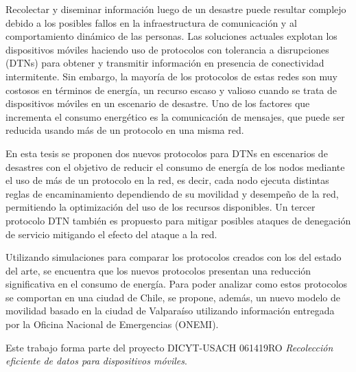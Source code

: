 

Recolectar y diseminar informaci\'on luego de un desastre puede resultar
complejo debido a los posibles fallos en la infraestructura de comunicaci\'on y
al comportamiento din\'amico de las personas. Las soluciones actuales explotan los
dispositivos m\'oviles haciendo uso de protocolos con tolerancia a disrupciones
(DTNs) para obtener y transmitir informaci\'on en presencia de conectividad
intermitente. Sin embargo, la mayor\'ia de los protocolos de estas redes son muy
costosos en t\'erminos de energ\'ia, un recurso escaso y valioso cuando se trata
de dispositivos m\'oviles en un escenario de desastre. Uno de los factores que
incrementa el consumo energético es la comunicación de mensajes, que puede ser
reducida usando más de un protocolo en una misma red.


En esta tesis se proponen dos nuevos protocolos para DTNs en escenarios de
desastres con el objetivo de reducir el consumo de energía de los nodos mediante
el uso de más de un protocolo en la red, es decir, cada nodo ejecuta distintas
reglas de encaminamiento dependiendo de su movilidad y desempeño de la red,
permitiendo la optimización del uso de los recursos disponibles. Un tercer
protocolo DTN también es propuesto para mitigar posibles ataques de denegación
de servicio mitigando el efecto del ataque a la red.

Utilizando simulaciones para comparar los protocolos creados con los del estado
del arte, se encuentra que los nuevos protocolos presentan una reducción
significativa en el consumo de energía. Para poder analizar como estos
protocolos se comportan en una ciudad de Chile, se propone, además, un nuevo
modelo de movilidad basado en la ciudad de Valparaíso utilizando información
entregada por la Oficina Nacional de Emergencias (ONEMI).


Este trabajo forma parte del proyecto DICYT-USACH 061419RO \textit{Recolección
eficiente de datos para dispositivos móviles}.
